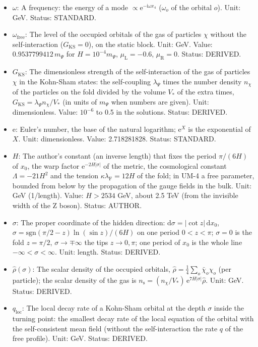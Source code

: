 \documentclass[
  10pt,
]{article}
\providecommand{\tightlist}{%
  \setlength{\itemsep}{0pt}\setlength{\parskip}{0pt}}
\begin{document}
\begin{itemize}
\tightlist
\item
  \(\omega\): A frequency: the energy of a mode
  \(\propto \mathrm{e}^{-\mathrm{i}\omega x_4}\) (\(\omega_o\) of the
  orbital \(o\)). Unit: GeV. Status: STANDARD.
\item
  \(\omega_{\mathrm{free}}\): The level of the occupied orbitals of the
  gas of particles \(\chi\) without the self-interaction
  (\(G_{\mathrm{KS}} = 0\)), on the static block. Unit: GeV. Value:
  \(0.9537799412\,m_\Psi\) for \(H = 10^{-4}m_\Psi\),
  \(\mu_{\mathrm{L}} = -0.6\), \(\mu_{\mathrm{R}} = 0\). Status:
  DERIVED.
\item
  \(G_{\mathrm{KS}}\): The dimensionless strength of the
  self-interaction of the gas of particles \(\chi\) in the Kohn-Sham
  states: the self-coupling \(\lambda_\Psi\) times the number density
  \(n_\chi\) of the particles on the fold divided by the volume \(V_*\)
  of the extra times, \(G_{\mathrm{KS}} = \lambda_\Psi n_\chi/V_*\) (in
  units of \(m_\Psi\) when numbers are given). Unit: dimensionless.
  Value: \(10^{-6}\) to 0.5 in the solutions. Status: DERIVED.
\item
  \(\mathrm{e}\): Euler's number, the base of the natural logarithm;
  \(\mathrm{e}^{X}\) is the exponential of \(X\). Unit: dimensionless.
  Value: 2.718281828. Status: STANDARD.
\item
  \(H\): The author's constant (an inverse length) that fixes the period
  \(\pi/(6H)\) of \(x_0\), the warp factor
  \(\mathrm{e}^{-2H\lvert\sigma\rvert}\) of the metric, the cosmological
  constant \(\Lambda = -21H^2\) and the tension
  \(\kappa\lambda_{\mathrm{F}} = 12H\) of the fold; in UM-4 a free
  parameter, bounded from below by the propagation of the gauge fields
  in the bulk. Unit: GeV (1/length). Value: \(H > 2534\) GeV, about 2.5
  TeV (from the invisible width of the Z boson). Status: AUTHOR.
\item
  \(\sigma\): The proper coordinate of the hidden direction:
  \(\mathrm{d}\sigma = \lvert\cot z\rvert\,\mathrm{d}x_0\),
  \(\sigma = \mathrm{sgn}(\pi/2 - z)\ln(\sin z)/(6H)\) on one period
  \(0 < z < \pi\); \(\sigma = 0\) is the fold \(z = \pi/2\),
  \(\sigma \to \mp\infty\) the tips \(z \to 0, \pi\); one period of
  \(x_0\) is the whole line \(-\infty < \sigma < \infty\). Unit: length.
  Status: DERIVED.
\item
  \(\hat\rho(\sigma)\): The scalar density of the occupied orbitals,
  \(\hat\rho = \frac14\sum_o\bar\chi_o\chi_o\) (per particle); the
  scalar density of the gas is
  \(n_{\mathrm{s}} = (n_\chi/V_*)\,\mathrm{e}^{7H\lvert\sigma\rvert}\hat\rho\).
  Unit: GeV. Status: DERIVED.
\item
  \(q_{\mathrm{loc}}\): The local decay rate of a Kohn-Sham orbital at
  the depth \(\sigma\) inside the turning point: the smallest decay rate
  of the local equation of the orbital with the self-consistent mean
  field (without the self-interaction the rate \(q\) of the free
  profile). Unit: GeV. Status: DERIVED.
\end{itemize}
\end{document}
